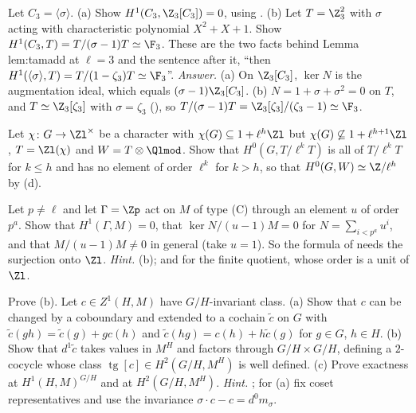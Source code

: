 \begin{exercise}\label{ex:cohomology:c3}
Let $C_3=\langle\sigma\rangle$. (a) Show $H^1(C_3,\Z_3[C_3])=0$, using . (b) Let $T=\Z_3^2$ with $\sigma$ acting with characteristic polynomial $X^2+X+1$. Show
$H^1(C_3,T)=T/(\sigma-1)T\simeq\F_3$. These are the two facts behind Lemma lem:tamadd at $\ell=3$ and the sentence after it, ``then
$H^1(\langle\sigma\rangle,T)=T/(1-\zeta_3)T\simeq\F_3$''.
\emph{Answer.} (a) On $\Z_3[C_3]$, $\ker N$ is the augmentation ideal, which equals $(\sigma-1)\Z_3[C_3]$. (b) $N=1+\sigma+\sigma^2=0$ on $T$, and $T\simeq\Z_3[\zeta_3]$ with $\sigma=\zeta_3$
(), so $T/(\sigma-1)T=\Z_3[\zeta_3]/(\zeta_3-1)\simeq\F_3$.
\end{exercise}

\begin{exercise}\label{ex:cohomology:h0-length}
Let $\chi\colon G\to\Zl^\times$ be a character with $\chi(G)\subseteq1+\ell^h\Zl$ but $\chi(G)\not\subseteq1+\ell^{h+1}\Zl$, $T=\Zl(\chi)$ and $W=T\otimes\Qlmod$. Show that $H^0(G,T/\ell^kT)$ is all
of $T/\ell^kT$ for $k\le h$ and has no element of order $\ell^k$ for $k>h$, so that $H^0(G,W)\simeq\Z/\ell^h$ by (d).
\end{exercise}

\begin{exercise}\label{ex:cohomology:zp-not-zl}
Let $p\ne\ell$ and let $\Gamma=\Zp$ act on $M$ of type (C) through an element $u$ of order $p^a$. Show that $H^1(\Gamma,M)=0$, that $\ker N/(u-1)M=0$ for $N=\sum_{i<p^a}u^i$, and that
$M/(u-1)M\ne0$ in general (take $u=1$). So the formula of  needs the surjection onto $\Zl$.
\emph{Hint.} (b); and  for the finite quotient, whose order is a unit of $\Zl$.
\end{exercise}

\begin{exercise}[harder]\label{ex:cohomology:transgression}
Prove (b). Let $c\in Z^1(H,M)$ have $G/H$-invariant class. (a) Show that $c$ can be changed by a coboundary and extended to a cochain $\tilde c$
on $G$ with $\tilde c(gh)=\tilde c(g)+gc(h)$ and $\tilde c(hg)=c(h)+h\tilde c(g)$ for $g\in G$, $h\in H$. (b) Show that $d^1\tilde c$ takes values in $M^H$ and factors through
$G/H\times G/H$, defining a $2$-cocycle whose class $\operatorname{tg}[c]\in H^2(G/H,M^H)$ is well defined. (c) Prove exactness at $H^1(H,M)^{G/H}$ and at $H^2(G/H,M^H)$.
\emph{Hint.} \cite[Chapter I, Section 6]{NSW}; for (a) fix coset representatives and use the invariance $\sigma\cdot c-c=d^0m_\sigma$.
\end{exercise}

